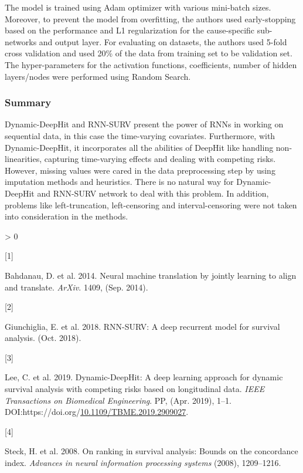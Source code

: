\documentclass[
]{article}
\newlength{\cslhangindent}
\newlength{\csllabelwidth}
\newenvironment{CSLReferences}[2] %
 {%
  \setlength{\parindent}{0pt}
  \ifodd #1 \everypar{\setlength{\hangindent}{\cslhangindent}}\ignorespaces\fi
  \ifnum #2 > 0
  \setlength{\parskip}{#2\baselineskip}
  \fi
 }%
 {}
\newcommand{\CSLLeftMargin}[1]{\parbox[t]{\csllabelwidth}{#1}}
\newcommand{\CSLRightInline}[1]{\parbox[t]{\linewidth - \csllabelwidth}{#1}\break}
\begin{document}
The model is trained using Adam optimizer with various mini-batch sizes. Moreover, to prevent the model from overfitting, the authors used early-stopping based on the performance and L1 regularization for the cause-specific sub-networks and output layer. For evaluating on datasets, the authors used 5-fold cross validation and used 20\% of the data from training set to be validation set. The hyper-parameters for the activation functions, coefficients, number of hidden layers/nodes were performed using Random Search.

\hypertarget{summary}{%
\subsubsection{Summary}\label{summary}}

Dynamic-DeepHit and RNN-SURV present the power of RNNs in working on sequential data, in this case the time-varying covariates. Furthermore, with Dynamic-DeepHit, it incorporates all the abilities of DeepHit like handling non-linearities, capturing time-varying effects and dealing with competing risks.\\
However, missing values were cared in the data preprocessing step by using imputation methods and heuristics. There is no natural way for Dynamic-DeepHit and RNN-SURV network to deal with this problem. In addition, problems like left-truncation, left-censoring and interval-censoring were not taken into consideration in the methods.

\hypertarget{refs}{}
\begin{CSLReferences}{0}{0}
\leavevmode\hypertarget{ref-temporal-attention-mechanism}{}%
\CSLLeftMargin{{[}1{]} }
\CSLRightInline{Bahdanau, D. et al. 2014. Neural machine translation by jointly learning to align and translate. \emph{ArXiv}. 1409, (Sep. 2014).}

\leavevmode\hypertarget{ref-rnn-surv}{}%
\CSLLeftMargin{{[}2{]} }
\CSLRightInline{Giunchiglia, E. et al. 2018. RNN-SURV: A deep recurrent model for survival analysis. (Oct. 2018).}

\leavevmode\hypertarget{ref-dynamic-deephit}{}%
\CSLLeftMargin{{[}3{]} }
\CSLRightInline{Lee, C. et al. 2019. Dynamic-DeepHit: A deep learning approach for dynamic survival analysis with competing risks based on longitudinal data. \emph{IEEE Transactions on Biomedical Engineering}. PP, (Apr. 2019), 1--1. DOI:https://doi.org/\href{https://doi.org/10.1109/TBME.2019.2909027}{10.1109/TBME.2019.2909027}.}

\leavevmode\hypertarget{ref-c-idx-bound}{}%
\CSLLeftMargin{{[}4{]} }
\CSLRightInline{Steck, H. et al. 2008. On ranking in survival analysis: Bounds on the concordance index. \emph{Advances in neural information processing systems} (2008), 1209--1216.}

\end{CSLReferences}
\end{document}
